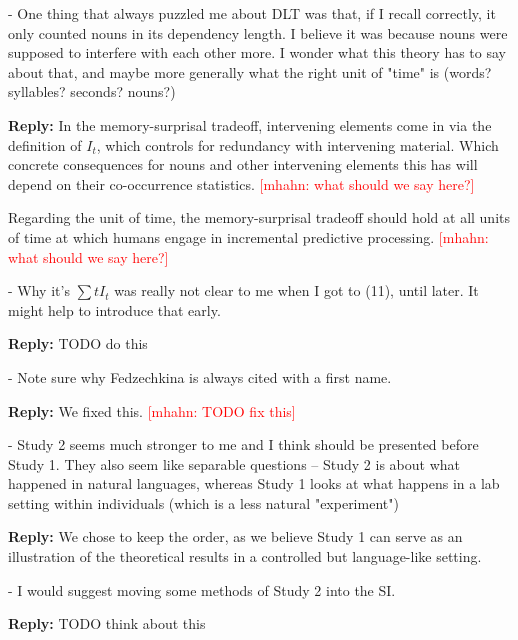 \documentclass{article}[11pt,a4paper,oneside]
\newcommand\mhahn[1]{\textcolor{red}{[mhahn: #1]}}
\newenvironment{reply}
  {\par\medskip
   \color{blue}%
   \begin{framed}
   \textbf{Reply: }\ignorespaces}
 {\end{framed}
  \medskip}
\begin{document}
- One thing that always puzzled me about DLT was that, if I recall correctly, it only counted nouns in its dependency length. I believe it was because nouns were supposed to interfere with each other more. I wonder what this theory has to say about that, and maybe more generally what the right unit of "time" is (words? syllables? seconds? nouns?)

\begin{reply}
In the memory-surprisal tradeoff, intervening elements come in via the definition of $I_t$, which controls for redundancy with intervening material.
Which concrete consequences for nouns and other intervening elements this has will depend on their co-occurrence statistics.
	\mhahn{what should we say here?}


Regarding the unit of time, the memory-surprisal tradeoff should hold at all units of time at which humans engage in incremental predictive processing.
	\mhahn{what should we say here?}

\end{reply}

- Why it's $\sum t I_t$ was really not clear to me when I got to (11), until later. It might help to introduce that early.

\begin{reply}
	TODO do this
\end{reply}

- Note sure why Fedzechkina is always cited with a first name.

\begin{reply}
	We fixed this. \mhahn{TODO fix this}
\end{reply}

- Study 2 seems much stronger to me and I think should be presented before Study 1. They also seem like separable questions -- Study 2 is about what happened in natural languages, whereas Study 1 looks at what happens in a lab setting within individuals (which is a less natural "experiment")

\begin{reply}
We chose to keep the order, as we believe Study 1 can serve as an illustration of the theoretical results in a controlled but language-like setting.
\end{reply}

- I would suggest moving some methods of Study 2 into the SI.

\begin{reply}
	TODO think about this
\end{reply}
\end{document}

